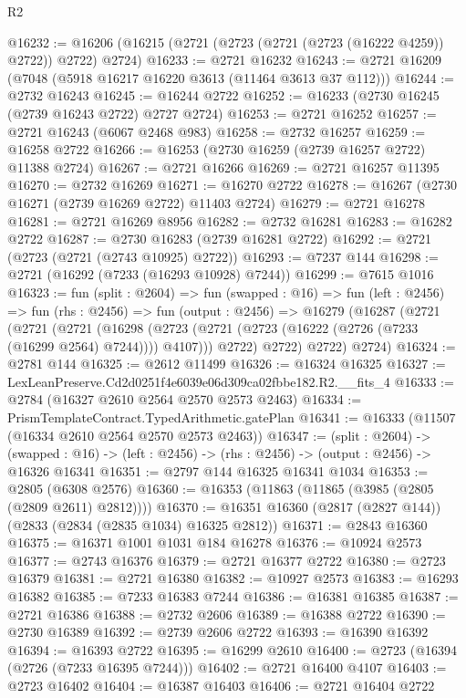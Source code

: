 \begin{lexlean}{R2}
\begin{coremodule}
@16232 := @16206 (@16215 (@2721 (@2723 (@2721 (@2723 (@16222 @4259)) @2722)) @2722) @2724)
@16233 := @2721 @16232
@16243 := @2721 @16209 (@7048 (@5918 @16217 @16220 @3613 (@11464 @3613 @37 @112)))
@16244 := @2732 @16243
@16245 := @16244 @2722
@16252 := @16233 (@2730 @16245 (@2739 @16243 @2722) @2727 @2724)
@16253 := @2721 @16252
@16257 := @2721 @16243 (@6067 @2468 @983)
@16258 := @2732 @16257
@16259 := @16258 @2722
@16266 := @16253 (@2730 @16259 (@2739 @16257 @2722) @11388 @2724)
@16267 := @2721 @16266
@16269 := @2721 @16257 @11395
@16270 := @2732 @16269
@16271 := @16270 @2722
@16278 := @16267 (@2730 @16271 (@2739 @16269 @2722) @11403 @2724)
@16279 := @2721 @16278
@16281 := @2721 @16269 @8956
@16282 := @2732 @16281
@16283 := @16282 @2722
@16287 := @2730 @16283 (@2739 @16281 @2722)
@16292 := @2721 (@2723 (@2721 (@2743 @10925) @2722))
@16293 := @7237 @144
@16298 := @2721 (@16292 (@7233 (@16293 @10928) @7244))
@16299 := @7615 @1016
@16323 := fun (split : @2604) =>
  fun (swapped : @16) =>
  fun (left : @2456) =>
  fun (rhs : @2456) =>
  fun (output : @2456) =>
  @16279
    (@16287
      (@2721
        (@2721
          (@2721
            (@16298 (@2723 (@2721 (@2723 (@16222 (@2726 (@7233 (@16299 @2564) @7244)))) @4107)))
            @2722)
          @2722)
        @2722)
      @2724)
@16324 := @2781 @144
@16325 := @2612 @11499
@16326 := @16324 @16325
@16327 := LexLeanPreserve.Cd2d0251f4e6039e06d309ca02fbbe182.R2.__fits_4
@16333 := @2784 (@16327 @2610 @2564 @2570 @2573 @2463)
@16334 := PrismTemplateContract.TypedArithmetic.gatePlan
@16341 := @16333 (@11507 (@16334 @2610 @2564 @2570 @2573 @2463))
@16347 := (split : @2604) ->
  (swapped : @16) -> (left : @2456) -> (rhs : @2456) -> (output : @2456) -> @16326 @16341
@16351 := @2797 @144 @16325 @16341 @1034
@16353 := @2805 (@6308 @2576)
@16360 := @16353 (@11863 (@11865 (@3985 (@2805 (@2809 @2611) @2812))))
@16370 := @16351 @16360 (@2817 (@2827 @144)) (@2833 (@2834 (@2835 @1034) @16325 @2812))
@16371 := @2843 @16360
@16375 := @16371 @1001 @1031 @184 @16278
@16376 := @10924 @2573
@16377 := @2743 @16376
@16379 := @2721 @16377 @2722
@16380 := @2723 @16379
@16381 := @2721 @16380
@16382 := @10927 @2573
@16383 := @16293 @16382
@16385 := @7233 @16383 @7244
@16386 := @16381 @16385
@16387 := @2721 @16386
@16388 := @2732 @2606
@16389 := @16388 @2722
@16390 := @2730 @16389
@16392 := @2739 @2606 @2722
@16393 := @16390 @16392
@16394 := @16393 @2722
@16395 := @16299 @2610
@16400 := @2723 (@16394 (@2726 (@7233 @16395 @7244)))
@16402 := @2721 @16400 @4107
@16403 := @2723 @16402
@16404 := @16387 @16403
@16406 := @2721 @16404 @2722

\end{coremodule}
\end{lexlean}
